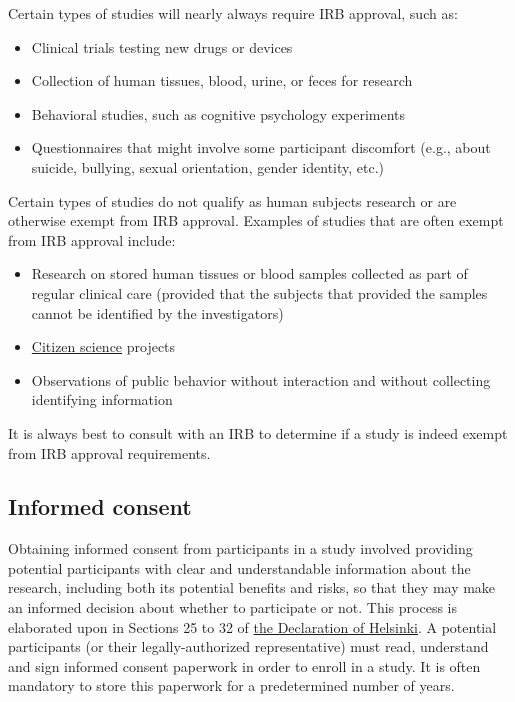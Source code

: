 \documentclass[letterpaper, 12pt]{article}
\begin{document}
Certain types of studies will nearly always require IRB approval, such as:

\begin{itemize}
    \setlength\itemsep{-0.5em}
    \item Clinical trials testing new drugs or devices
    \item Collection of human tissues, blood, urine, or feces for research
    \item Behavioral studies, such as cognitive psychology experiments
    \item Questionnaires that might involve some participant discomfort (e.g., about suicide, bullying, sexual orientation, gender identity, etc.)
\end{itemize}

Certain types of studies do not qualify as human subjects research or are otherwise exempt from IRB approval. Examples of studies that are often exempt from IRB approval include:

\begin{itemize}
    \setlength\itemsep{-0.5em}
    \item Research on stored human tissues or blood samples collected as part of regular clinical care (provided that the subjects that provided the samples cannot be identified by the investigators)
    \item \href{https://en.wikipedia.org/wiki/Citizen_science}{Citizen science} projects
    \item Observations of public behavior without interaction and without collecting identifying information
\end{itemize}

It is always best to consult with an IRB to determine if a study is indeed exempt from IRB approval requirements.

\subsection*{Informed consent}

Obtaining informed consent from participants in a study involved providing potential participants with clear and understandable information about the research, including both its potential benefits and risks, so that they may make an informed decision about whether to participate or not. This process is elaborated upon in Sections 25 to 32 of \href{https://www.wma.net/policies-post/wma-declaration-of-helsinki/}{the Declaration of Helsinki}. A potential participants (or their legally-authorized representative) must read, understand and sign informed consent paperwork in order to enroll in a study. It is often mandatory to store this paperwork for a predetermined number of years.
\end{document}
